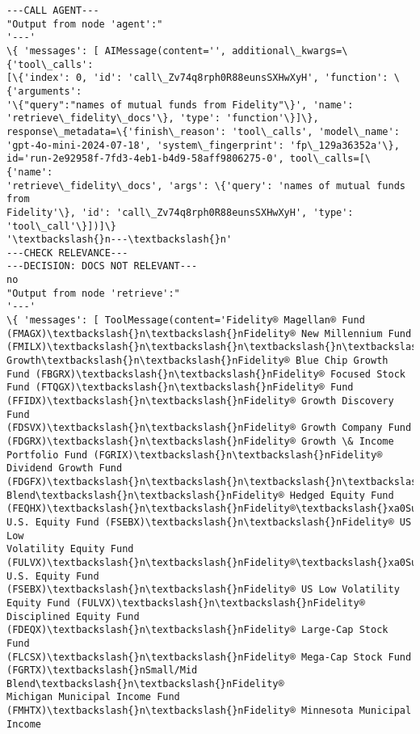 \documentclass[11pt]{article}
\begin{document}
    \begin{Verbatim}[commandchars=\\\{\}]
---CALL AGENT---
"Output from node 'agent':"
'---'
\{ 'messages': [ AIMessage(content='', additional\_kwargs=\{'tool\_calls':
[\{'index': 0, 'id': 'call\_Zv74q8rph0R88eunsSXHwXyH', 'function': \{'arguments':
'\{"query":"names of mutual funds from Fidelity"\}', 'name':
'retrieve\_fidelity\_docs'\}, 'type': 'function'\}]\},
response\_metadata=\{'finish\_reason': 'tool\_calls', 'model\_name':
'gpt-4o-mini-2024-07-18', 'system\_fingerprint': 'fp\_129a36352a'\},
id='run-2e92958f-7fd3-4eb1-b4d9-58aff9806275-0', tool\_calls=[\{'name':
'retrieve\_fidelity\_docs', 'args': \{'query': 'names of mutual funds from
Fidelity'\}, 'id': 'call\_Zv74q8rph0R88eunsSXHwXyH', 'type': 'tool\_call'\}])]\}
'\textbackslash{}n---\textbackslash{}n'
---CHECK RELEVANCE---
---DECISION: DOCS NOT RELEVANT---
no
"Output from node 'retrieve':"
'---'
\{ 'messages': [ ToolMessage(content='Fidelity® Magellan® Fund
(FMAGX)\textbackslash{}n\textbackslash{}nFidelity® New Millennium Fund (FMILX)\textbackslash{}n\textbackslash{}n\textbackslash{}n\textbackslash{}n\textbackslash{}n\textbackslash{}n\textbackslash{}nLarge
Growth\textbackslash{}n\textbackslash{}nFidelity® Blue Chip Growth Fund (FBGRX)\textbackslash{}n\textbackslash{}nFidelity® Focused Stock
Fund (FTQGX)\textbackslash{}n\textbackslash{}nFidelity® Fund (FFIDX)\textbackslash{}n\textbackslash{}nFidelity® Growth Discovery Fund
(FDSVX)\textbackslash{}n\textbackslash{}nFidelity® Growth Company Fund (FDGRX)\textbackslash{}n\textbackslash{}nFidelity® Growth \& Income
Portfolio Fund (FGRIX)\textbackslash{}n\textbackslash{}nFidelity® Dividend Growth Fund
(FDGFX)\textbackslash{}n\textbackslash{}n\textbackslash{}n\textbackslash{}n\textbackslash{}n\textbackslash{}n\textbackslash{}nLarge Blend\textbackslash{}n\textbackslash{}nFidelity® Hedged Equity Fund
(FEQHX)\textbackslash{}n\textbackslash{}nFidelity®\textbackslash{}xa0Sustainable U.S. Equity Fund (FSEBX)\textbackslash{}n\textbackslash{}nFidelity® US Low
Volatility Equity Fund (FULVX)\textbackslash{}n\textbackslash{}nFidelity®\textbackslash{}xa0Sustainable U.S. Equity Fund
(FSEBX)\textbackslash{}n\textbackslash{}nFidelity® US Low Volatility Equity Fund (FULVX)\textbackslash{}n\textbackslash{}nFidelity®
Disciplined Equity Fund (FDEQX)\textbackslash{}n\textbackslash{}nFidelity® Large-Cap Stock Fund
(FLCSX)\textbackslash{}n\textbackslash{}nFidelity® Mega-Cap Stock Fund (FGRTX)\textbackslash{}nSmall/Mid Blend\textbackslash{}n\textbackslash{}nFidelity®
Michigan Municipal Income Fund (FMHTX)\textbackslash{}n\textbackslash{}nFidelity® Minnesota Municipal Income

\end{Verbatim}
\end{document}
